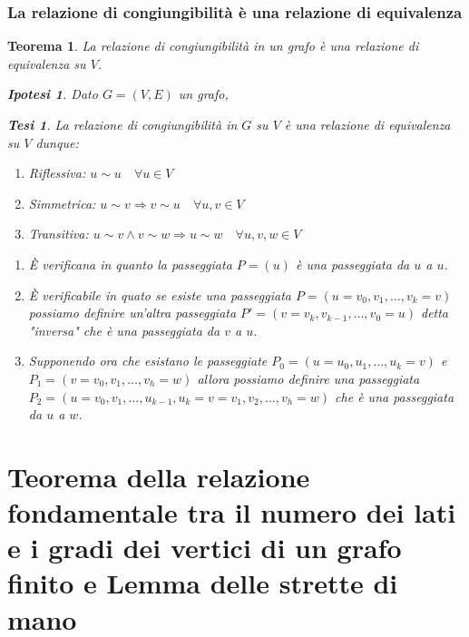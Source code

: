 \documentclass{article}
\makeatletter
\renewenvironment{proof}[1][\proofname]{\par
    \pushQED{\qed}%
    \normalfont \topsep6\p@\@plus6\p@\relax
    \trivlist
    \item\relax
    {\itshape
    #1\@addpunct{.}}\hspace\labelsep\ignorespaces
    }{%
    \popQED\endtrivlist\@endpefalse
}
\newtheorem{theorem}{Teorema}[part]
\newtheorem{ipothesis}[lemma]{Ipotesi}
\newtheorem{thesis}[lemma]{Tesi}
\theoremstyle{definition}
\makeatother
\begin{document}
    \section{La relazione di congiungibilità è una relazione di equivalenza}
        \begin{theorem}
            La relazione di congiungibilità in un grafo è una relazione di equivalenza su \(V\).
            \begin{ipothesis}
                Dato \(G=(V,E)\) un grafo,
            \end{ipothesis}
            \begin{thesis}
                La relazione di congiungibilità in \(G\) su \(V\) è una relazione di equivalenza su \(V\) dunque:
                \begin{enumerate}
                    \item Riflessiva: \(u\sim u\quad \forall u\in V\)
                    \item Simmetrica: \(u\sim v\Rightarrow v\sim u\quad \forall u,v\in V\)
                    \item Transitiva: \(u\sim v\land v\sim w\Rightarrow u\sim w\quad \forall u,v,w\in V\)
                \end{enumerate}
            \end{thesis}
            \begin{proof}
                \begin{enumerate}
                    \item È verificana in quanto la passeggiata \(P=(u)\) è una passeggiata da \(u\) a \(u\).
                    \item È verificabile in quato se esiste una passeggiata \(P=(u=v_0,v_1,\ldots,v_k=v)\) possiamo definire un'altra passeggiata \(P'=(v=v_k,v_{k-1},\ldots,v_0=u)\) detta "inversa" che è una passeggiata da \(v\) a \(u\).
                    \item Supponendo ora che esistano le passeggiate \(P_0=(u=u_0,u_1,\ldots,u_k=v)\) e \(P_1=(v=v_0,v_1,\ldots,v_h=w)\) allora possiamo definire una passeggiata \(P_2=(u=v_0,v_1,\ldots,u_{k-1},u_{k}=v=v_{1},v_{2},\ldots,v_h=w)\) che è una passeggiata da \(u\) a \(w\).
                \end{enumerate}
                \pushQED{}
            \end{proof}
            \raggedleft{{\ensuremath{\blacksquare}}}
        \end{theorem}
\part{Teorema della relazione fondamentale tra il numero dei lati e i gradi dei vertici di un grafo finito e Lemma delle strette di mano}
\end{document}
